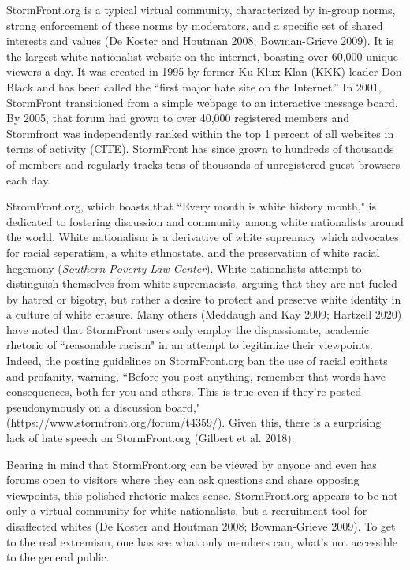 \documentclass[12pt]{paper}
\begin{document}
StormFront.org is a typical virtual community, characterized by in-group norms, strong enforcement of these norms by moderators, and a specific set of shared interests and values (De Koster and Houtman 2008; Bowman-Grieve 2009). It is the largest white nationalist website on the internet, boasting over 60,000 unique viewers a day. It was created in 1995 by former Ku Klux Klan (KKK) leader Don Black and has been called the “first major hate site on the Internet.” In 2001, StormFront transitioned from a simple webpage to an interactive message board. By 2005, that forum had grown to over 40,000 registered members and Stormfront was independently ranked within the top 1 percent of all websites in terms of activity (CITE). StormFront has since grown to hundreds of thousands of members and regularly tracks tens of thousands of unregistered guest browsers each day.

StromFront.org, which boasts that ``Every month is white history month," is dedicated to fostering discussion and community among white nationalists around the world. White nationalism is a derivative of white supremacy which advocates for racial seperatism, a white ethnostate, and the preservation of white racial hegemony (\textit{Southern Poverty Law Center}). White nationalists attempt to distinguish themselves from white supremacists, arguing that they are not fueled by hatred or bigotry, but rather a desire to protect and preserve white identity in a culture of white erasure. Many others (Meddaugh and Kay 2009; Hartzell 2020) have noted that StormFront users only employ the dispassionate, academic rhetoric of ``reasonable racism" in an attempt to legitimize their viewpoints. Indeed, the posting guidelines on StormFront.org ban the use of racial epithets and profanity, warning, ``Before you post anything, remember that words have consequences, both for you and others. This is true even if they're posted pseudonymously on a discussion board," (https://www.stormfront.org/forum/t4359/). Given this, there is a surprising lack of hate speech on StormFront.org (Gilbert et al. 2018).

Bearing in mind that StormFront.org can be viewed by anyone and even has forums open to visitors where they can ask questions and share opposing viewpoints, this polished rhetoric makes sense. StormFront.org appears to be not only a virtual community for white nationalists, but a recruitment tool for disaffected whites (De Koster and Houtman 2008; Bowman-Grieve 2009). To get to the real extremism, one has see what only members can, what's not accessible to the general public.
\end{document}

